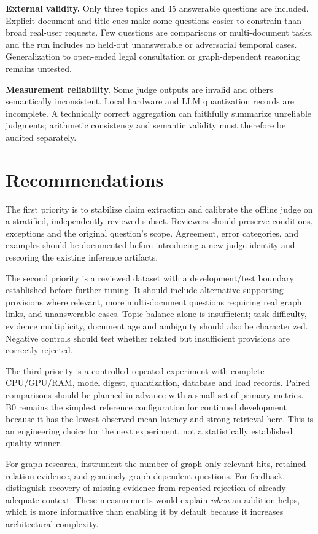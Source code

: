 \textbf{External validity.} Only three topics and 45 answerable questions are included. Explicit document and title cues make some questions easier to constrain than broad real-user requests. Few questions are comparisons or multi-document tasks, and the run includes no held-out unanswerable or adversarial temporal cases. Generalization to open-ended legal consultation or graph-dependent reasoning remains untested.

\textbf{Measurement reliability.} Some judge outputs are invalid and others semantically inconsistent. Local hardware and LLM quantization records are incomplete. A technically correct aggregation can faithfully summarize unreliable judgments; arithmetic consistency and semantic validity must therefore be audited separately.

\clearpage
\section{Recommendations}
The first priority is to stabilize claim extraction and calibrate the offline judge on a stratified, independently reviewed subset. Reviewers should preserve conditions, exceptions and the original question's scope. Agreement, error categories, and examples should be documented before introducing a new judge identity and rescoring the existing inference artifacts.

The second priority is a reviewed dataset with a development/test boundary established before further tuning. It should include alternative supporting provisions where relevant, more multi-document questions requiring real graph links, and unanswerable cases. Topic balance alone is insufficient; task difficulty, evidence multiplicity, document age and ambiguity should also be characterized. Negative controls should test whether related but insufficient provisions are correctly rejected.

The third priority is a controlled repeated experiment with complete CPU/GPU/RAM, model digest, quantization, database and load records. Paired comparisons should be planned in advance with a small set of primary metrics. B0 remains the simplest reference configuration for continued development because it has the lowest observed mean latency and strong retrieval here. This is an engineering choice for the next experiment, not a statistically established quality winner.

For graph research, instrument the number of graph-only relevant hits, retained relation evidence, and genuinely graph-dependent questions. For feedback, distinguish recovery of missing evidence from repeated rejection of already adequate context. These measurements would explain \emph{when} an addition helps, which is more informative than enabling it by default because it increases architectural complexity.

